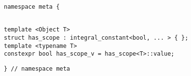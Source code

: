 
\begin{verbatim}
namespace meta {
\end{verbatim}
\begin{verbatim}

template <Object T>
struct has_scope : integral_constant<bool, ... > { };
template <typename T>
constexpr bool has_scope_v = has_scope<T>::value;

\end{verbatim}
\begin{verbatim}
} // namespace meta
\end{verbatim}
